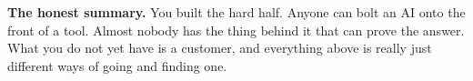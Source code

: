 \documentclass[11pt,a4paper]{article}
\begin{document}
\vspace{10pt}
\begin{keybox}
\textbf{The honest summary.} You built the hard half. Anyone can bolt an AI onto the
front of a tool. Almost nobody has the thing behind it that can prove the answer. What
you do not yet have is a customer, and everything above is really just different ways of
going and finding one.
\end{keybox}
\end{document}

